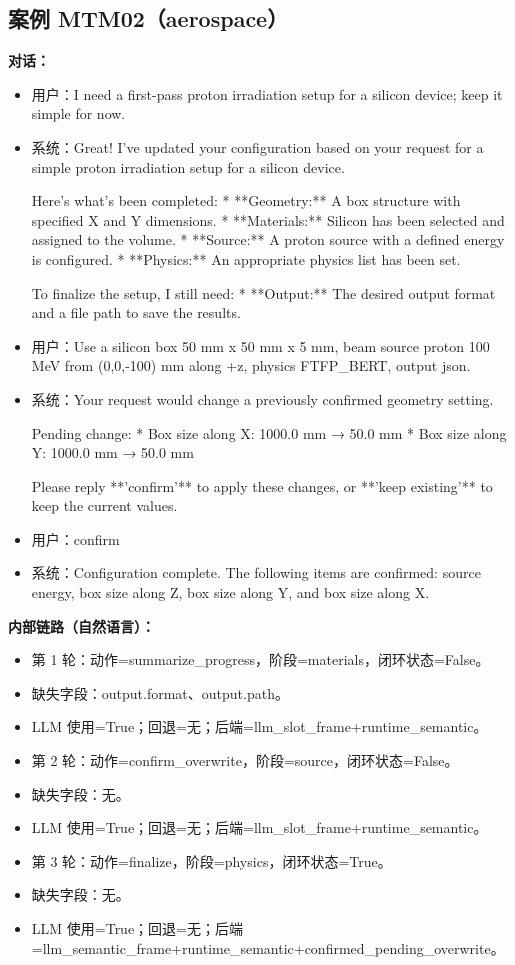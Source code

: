 \documentclass[11pt]{ctexart}
\begin{document}
\subsection{案例 MTM02（aerospace）}
\textbf{对话：}
\begin{itemize}
\item 用户：I need a first-pass proton irradiation setup for a silicon device; keep it simple for now.
\item 系统：Great! I've updated your configuration based on your request for a simple proton irradiation setup for a silicon device.

Here's what's been completed:
*   **Geometry:** A box structure with specified X and Y dimensions.
*   **Materials:** Silicon has been selected and assigned to the volume.
*   **Source:** A proton source with a defined energy is configured.
*   **Physics:** An appropriate physics list has been set.

To finalize the setup, I still need:
*   **Output:** The desired output format and a file path to save the results.
\item 用户：Use a silicon box 50 mm x 50 mm x 5 mm, beam source proton 100 MeV from (0,0,-100) mm along +z, physics FTFP\_BERT, output json.
\item 系统：Your request would change a previously confirmed geometry setting.

Pending change:
*   Box size along X: 1000.0 mm → 50.0 mm
*   Box size along Y: 1000.0 mm → 50.0 mm

Please reply **'confirm'** to apply these changes, or **'keep existing'** to keep the current values.
\item 用户：confirm
\item 系统：Configuration complete. The following items are confirmed: source energy, box size along Z, box size along Y, and box size along X.
\end{itemize}
\textbf{内部链路（自然语言）：}
\begin{itemize}
\item 第 1 轮：动作=summarize\_progress，阶段=materials，闭环状态=False。
\item 缺失字段：output.format、output.path。
\item LLM 使用=True；回退=无；后端=llm\_slot\_frame+runtime\_semantic。
\item 第 2 轮：动作=confirm\_overwrite，阶段=source，闭环状态=False。
\item 缺失字段：无。
\item LLM 使用=True；回退=无；后端=llm\_slot\_frame+runtime\_semantic。
\item 第 3 轮：动作=finalize，阶段=physics，闭环状态=True。
\item 缺失字段：无。
\item LLM 使用=True；回退=无；后端=llm\_semantic\_frame+runtime\_semantic+confirmed\_pending\_overwrite。
\end{itemize}
\end{document}
